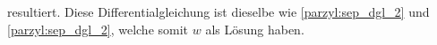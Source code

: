 resultiert. Diese Differentialgleichung ist dieselbe wie 
\eqref{parzyl:sep_dgl_2} und \eqref{parzyl:sep_dgl_2}, welche somit
$w$ als Lösung haben.

